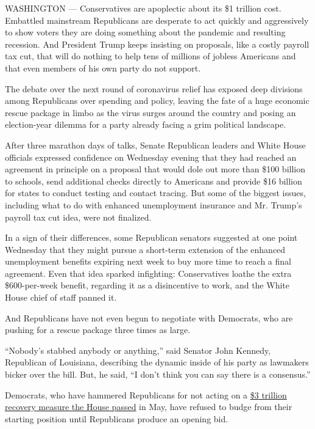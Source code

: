 WASHINGTON --- Conservatives are apoplectic about its \$1 trillion cost.
Embattled mainstream Republicans are desperate to act quickly and
aggressively to show voters they are doing something about the pandemic
and resulting recession. And President Trump keeps insisting on
proposals, like a costly payroll tax cut, that will do nothing to help
tens of millions of jobless Americans and that even members of his own
party do not support.

The debate over the next round of coronavirus relief has exposed deep
divisions among Republicans over spending and policy, leaving the fate
of a huge economic rescue package in limbo as the virus surges around
the country and posing an election-year dilemma for a party already
facing a grim political landscape.

After three marathon days of talks, Senate Republican leaders and White
House officials expressed confidence on Wednesday evening that they had
reached an agreement in principle on a proposal that would dole out more
than \$100 billion to schools, send additional checks directly to
Americans and provide \$16 billion for states to conduct testing and
contact tracing. But some of the biggest issues, including what to do
with enhanced unemployment insurance and Mr. Trump's payroll tax cut
idea, were not finalized.

In a sign of their differences, some Republican senators suggested at
one point Wednesday that they might pursue a short-term extension of the
enhanced unemployment benefits expiring next week to buy more time to
reach a final agreement. Even that idea sparked infighting:
Conservatives loathe the extra \$600-per-week benefit, regarding it as a
disincentive to work, and the White House chief of staff panned it.

And Republicans have not even begun to negotiate with Democrats, who are
pushing for a rescue package three times as large.

``Nobody's stabbed anybody or anything,'' said Senator John Kennedy,
Republican of Louisiana, describing the dynamic inside of his party as
lawmakers bicker over the bill. But, he said, ``I don't think you can
say there is a consensus.''

Democrats, who have hammered Republicans for not acting on a
\href{https://www.nytimes.com/2020/05/15/us/politics/house-simulus-vote.html}{\$3
trillion recovery measure the House passed} in May, have refused to
budge from their starting position until Republicans produce an opening
bid.

